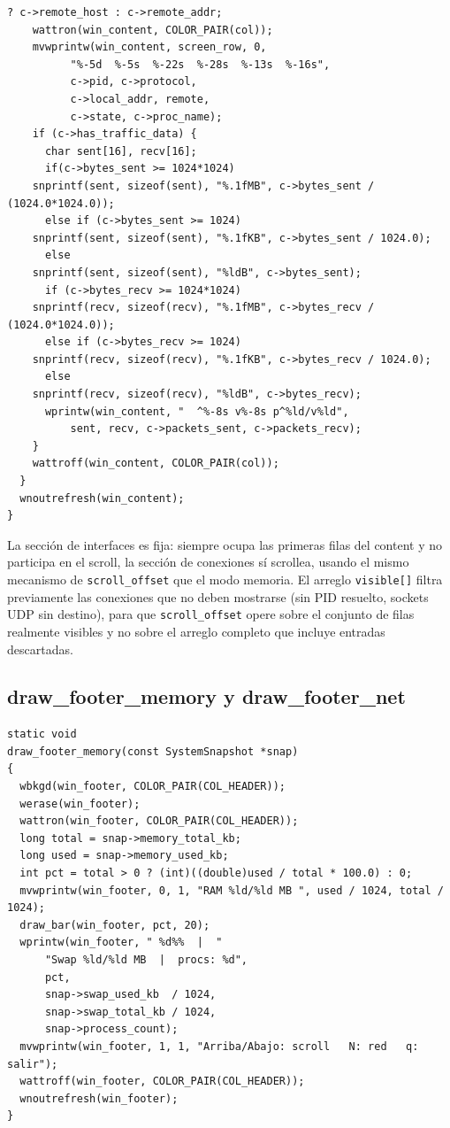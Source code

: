 \documentclass[12pt,letterpaper]{article}
\begin{document}
\begin{lstlisting}[style=modernc, caption={\texttt{ui.c} draw\_content\_net()}]
      ? c->remote_host : c->remote_addr;
    wattron(win_content, COLOR_PAIR(col));
    mvwprintw(win_content, screen_row, 0,
	      "%-5d  %-5s  %-22s  %-28s  %-13s  %-16s",
	      c->pid, c->protocol,
	      c->local_addr, remote,
	      c->state, c->proc_name);
    if (c->has_traffic_data) {
      char sent[16], recv[16];
      if(c->bytes_sent >= 1024*1024)
	snprintf(sent, sizeof(sent), "%.1fMB", c->bytes_sent / (1024.0*1024.0));
      else if (c->bytes_sent >= 1024)
	snprintf(sent, sizeof(sent), "%.1fKB", c->bytes_sent / 1024.0);
      else
	snprintf(sent, sizeof(sent), "%ldB", c->bytes_sent);
      if (c->bytes_recv >= 1024*1024)
	snprintf(recv, sizeof(recv), "%.1fMB", c->bytes_recv / (1024.0*1024.0));
      else if (c->bytes_recv >= 1024)
	snprintf(recv, sizeof(recv), "%.1fKB", c->bytes_recv / 1024.0);
      else
	snprintf(recv, sizeof(recv), "%ldB", c->bytes_recv);
      wprintw(win_content, "  ^%-8s v%-8s p^%ld/v%ld",
	      sent, recv, c->packets_sent, c->packets_recv);
    }
    wattroff(win_content, COLOR_PAIR(col));
  }
  wnoutrefresh(win_content);
}
\end{lstlisting}

La sección de interfaces es fija: siempre ocupa las primeras filas del content y no participa en el scroll, la
sección de conexiones sí scrollea, usando el mismo mecanismo de \texttt{scroll\_offset} que el modo memoria.
El arreglo \texttt{visible[]} filtra previamente las conexiones que no deben mostrarse
(sin PID resuelto, sockets UDP sin destino), para que \texttt{scroll\_offset} opere sobre el conjunto de filas
realmente visibles y no sobre el arreglo completo que incluye entradas descartadas.

\subsection*{draw\_footer\_memory y draw\_footer\_net}

\begin{lstlisting}[style=modernc, caption={\texttt{ui.c} draw\_footer\_memory()}]
static void
draw_footer_memory(const SystemSnapshot *snap)
{
  wbkgd(win_footer, COLOR_PAIR(COL_HEADER));
  werase(win_footer);
  wattron(win_footer, COLOR_PAIR(COL_HEADER));
  long total = snap->memory_total_kb;
  long used = snap->memory_used_kb;
  int pct = total > 0 ? (int)((double)used / total * 100.0) : 0;
  mvwprintw(win_footer, 0, 1, "RAM %ld/%ld MB ", used / 1024, total / 1024);
  draw_bar(win_footer, pct, 20);
  wprintw(win_footer, " %d%%  |  "
	  "Swap %ld/%ld MB  |  procs: %d",
	  pct,
	  snap->swap_used_kb  / 1024,
	  snap->swap_total_kb / 1024,
	  snap->process_count);
  mvwprintw(win_footer, 1, 1, "Arriba/Abajo: scroll   N: red   q: salir");
  wattroff(win_footer, COLOR_PAIR(COL_HEADER));
  wnoutrefresh(win_footer);
}
\end{lstlisting}
\end{document}
